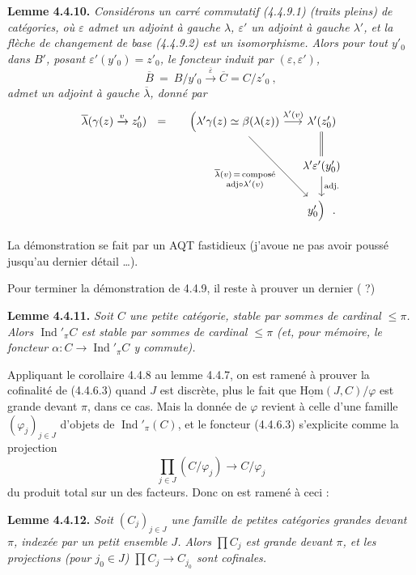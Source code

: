 \documentclass[11pt]{article}
\newcommand{\msp}[1]{\marginpar{\footnotesize [#1]}}
\newcommand{\uHom}{\underline{\mathrm{Hom}}}
\newcommand{\Ind}{\operatorname{Ind}}
\begin{document}
\textbf{Lemme 4.4.10.} \textit{Considérons un carré commutatif (4.4.9.1) (traits pleins) de catégories, où $\varepsilon$ admet un adjoint à gauche $\lambda$, $\varepsilon'$ un adjoint à gauche $\lambda'$, et la flèche de changement de base (4.4.9.2) est un isomorphisme. Alors pour tout $y'_0$ dans $B'$, posant $\varepsilon'(y'_0) = z'_0$, le foncteur induit par $(\varepsilon, \varepsilon')$,}
\[
\overline{B} \ =\ B/y'_0 \xrightarrow{\bar{\varepsilon}} \overline{C} = C/z'_0\ ,
\]
\textit{admet un adjoint à gauche $\overline{\lambda}$, donné par}
\[
\begin{tikzcd}[column sep=small]
\overline{\lambda}(\gamma(z) \xrightarrow{v} z'_0) \ \ = & \Bigl(\lambda'\gamma(z) \simeq \beta(\lambda(z)) \arrow[r, "{\lambda'(v)}"] \arrow[ddr, "{\substack{\overline{\lambda}(v) \,=\, \text{composé}\\ \text{adj} \circ \lambda'(v)}}"'] & \lambda'(z'_0) \arrow[d, equal] \\
 & & \lambda'\varepsilon'(y'_0) \arrow[d, "\text{adj.}"] \\
 & & y'_0\Bigr)\ \ .
\end{tikzcd}
\]

\msp{page 92}
La démonstration se fait par un AQT fastidieux (j'avoue ne pas avoir poussé jusqu'au dernier détail \ldots).

Pour terminer la démonstration de 4.4.9, il reste à prouver un dernier ( ?)

\textbf{Lemme 4.4.11.} \textit{Soit $C$ une petite catégorie, stable par sommes de cardinal $\leqslant \pi$. Alors $\Ind'_\pi C$ est stable par sommes de cardinal $\leqslant \pi$ (et, pour mémoire, le foncteur $\alpha : C \longrightarrow \Ind'_\pi C$ y commute).}

Appliquant le corollaire 4.4.8 au lemme 4.4.7, on est ramené à prouver la cofinalité de (4.4.6.3) quand $J$ est discrète, plus le fait que $\uHom(J,C)/\varphi$ est grande devant $\pi$, dans ce cas. Mais la donnée de $\varphi$ revient à celle d'une famille $(\varphi_j)_{j\in J}$ d'objets de $\Ind'_\pi(C)$, et le foncteur (4.4.6.3) s'explicite comme la projection
\[
\prod_{j\in J} (C/\varphi_j) \longrightarrow C/\varphi_j
\]
du produit total sur un des facteurs. Donc on est ramené à ceci :

\msp{page 93}
\textbf{Lemme 4.4.12.} \textit{Soit $(C_j)_{j\in J}$ une famille de petites catégories grandes devant $\pi$, indexée par un petit ensemble $J$. Alors $\prod C_j$ est grande devant $\pi$, et les projections (pour $j_0 \in J$) $\prod C_j \longrightarrow C_{j_0}$ sont cofinales.}
\end{document}
